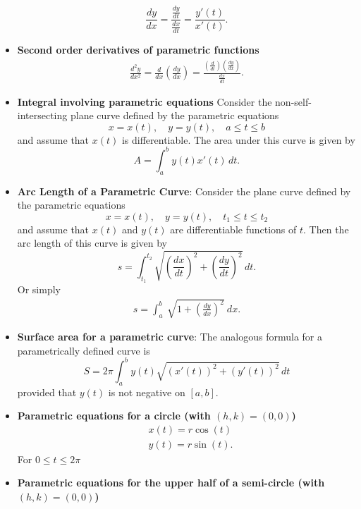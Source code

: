 \documentclass{report}
\begin{document}
\begin{itemize}
            \[
                \frac{dy}{dx} = \frac{\frac{dy}{dt}}{\frac{dx}{dt}} = \frac{y'(t)}{x'(t)}.
            \]
        \item \textbf{Second order derivatives of parametric functions}
            \begin{align*}
                \frac{d^{2}y}{dx^{2}} = \frac{d}{dx}\left(\frac{dy}{dx}\right) = \frac{\left(\frac{d}{dt}\right)\left(\frac{dy}{dx}\right)}{\frac{dx}{dt}}
            .\end{align*}
        \item \textbf{Integral involving parametric equations}
            Consider the non-self-intersecting plane curve defined by the parametric equations
            \[
                x = x(t), \quad y = y(t), \quad a \leq t \leq b
            \]
            and assume that \( x(t) \) is differentiable. The area under this curve is given by
            \[
                A = \int_{a}^{b} y(t) x'(t) \, dt.
            \]
        \item \textbf{Arc Length of a Parametric Curve}:
            Consider the plane curve defined by the parametric equations
            \[
                x = x(t), \quad y = y(t), \quad t_1 \leq t \leq t_2
            \]
            and assume that \( x(t) \) and \( y(t) \) are differentiable functions of \( t \). Then the arc length of this curve is given by
            \[
                s = \int_{t_1}^{t_2} \sqrt{\left(\frac{dx}{dt}\right)^2 + \left(\frac{dy}{dt}\right)^2} \, dt.
            \]
            Or simply
            \begin{align*}
                s = \int_{a}^{b}\ \sqrt{1 + \left(\frac{dy}{dx}\right)^{2}}\ dx
            .\end{align*}
        \item \textbf{Surface area for a parametric curve}:
            The analogous formula for a parametrically defined curve is
            \[
                S = 2\pi \int_{a}^{b} y(t) \sqrt{(x'(t))^2 + (y'(t))^2} \, dt
            \]
            provided that \( y(t) \) is not negative on \([a, b]\).
        \item \textbf{Parametric equations for a circle (with $(h,k) = (0,0)$)}
            \begin{align*}
                &x(t) = r\cos{(t)} \\
                &y(t) = r\sin{(t)}
            .\end{align*}
            For $0 \leq t \leq 2\pi $
        \item \textbf{Parametric equations for the upper half of a semi-circle (with $(h,k) = (0,0)$)}

\end{itemize}
\end{document}
